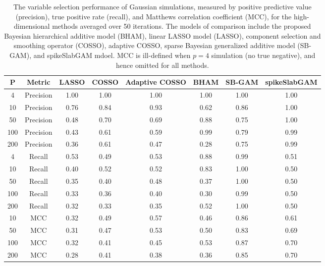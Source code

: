\begin{table}[ht]
\centering
\begin{tabular}{cccccccc}
  \hline
P & Metric & LASSO & COSSO & Adaptive COSSO & BHAM & SB-GAM & spikeSlabGAM \\ 
  \hline
  4 & Precision & 1.00 & 1.00 & 1.00 & 1.00 & 1.00 & 1.00 \\ 
   10 & Precision & 0.76 & 0.84 & 0.93 & 0.62 & 0.86 & 1.00 \\ 
   50 & Precision & 0.48 & 0.70 & 0.69 & 0.88 & 0.75 & 1.00 \\ 
  100 & Precision & 0.43 & 0.61 & 0.59 & 0.99 & 0.79 & 0.99 \\ 
  200 & Precision & 0.36 & 0.61 & 0.47 & 0.28 & 0.75 & 0.99 \\ 
   \hline
  4 & Recall & 0.53 & 0.49 & 0.53 & 0.88 & 0.99 & 0.51 \\ 
   10 & Recall & 0.40 & 0.52 & 0.52 & 0.83 & 1.00 & 0.50 \\ 
   50 & Recall & 0.35 & 0.40 & 0.48 & 0.37 & 1.00 & 0.50 \\ 
  100 & Recall & 0.33 & 0.36 & 0.40 & 0.30 & 0.99 & 0.50 \\ 
  200 & Recall & 0.32 & 0.33 & 0.35 & 0.52 & 1.00 & 0.50 \\ 
   \hline
 10 & MCC & 0.32 & 0.49 & 0.57 & 0.46 & 0.86 & 0.61 \\ 
   50 & MCC & 0.31 & 0.47 & 0.53 & 0.50 & 0.83 & 0.69 \\ 
  100 & MCC & 0.32 & 0.41 & 0.45 & 0.53 & 0.87 & 0.70 \\ 
  200 & MCC & 0.28 & 0.41 & 0.38 & 0.36 & 0.85 & 0.70 \\ 
   \hline
\end{tabular}
\caption{The variable selection performance of Gaussian simulations,
                         measured by positive predictive value (precision), true positive rate (recall),
                         and Matthews correlation coefficient (MCC), for the high-dimensional methods
                         averaged over 50 iterations. The models of comparison include the proposed Bayesian
                         hierarchical additive model (BHAM), linear LASSO model (LASSO), component selection
                         and smoothing operator (COSSO), adaptive COSSO, sparse Bayesian generalized additive
                         model (SB-GAM), and spikeSlabGAM mdoel. MCC is ill-defined when $p=4$ simulation
                         (no true negative), and hence omitted for all methods.} 
\label{tab:sim_gaus_var_select}
\end{table}
